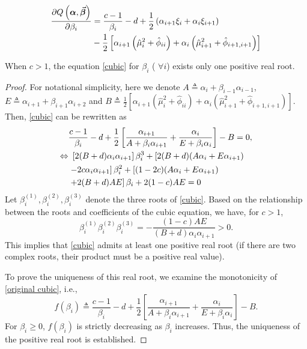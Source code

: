 \documentclass[10pt,a4paper]{amsart}
\begin{document}
\begin{align}
	\frac{\partial Q\left(\boldsymbol{\alpha}, \vec{\boldsymbol{\beta}}\right)}{\partial \beta_{i}}&=\frac{c-1}{\beta_i}-d +\frac{1}{2} \left(\alpha_{i+1}\xi_i + \alpha_{i}\xi_{i+1} \right)\notag\\
	&-\frac{1}{2}\left[\alpha_{i+1}\left(\hat{\mu}_i^2+\hat{\phi}_{ii}\right)+\alpha_i \left(\hat{\mu}_{i+1}^2+\hat{\phi}_{i+1,i+1}\right)\right]\label{cubic} 
\end{align}

\begin{theorem}\label{Thm1}
	When \( c > 1 \), the equation \eqref{cubic} for \( \beta_i \) ( \(\forall  i \)) exists only one positive real root.
\end{theorem}

\begin{proof}
	For notational simplicity, here we denote $A \triangleq \alpha_i+\beta_{i-1} \alpha_{i-1}$, $E \triangleq \alpha_{i+1}+\beta_{i+1}\alpha_{i+2}$ and $B \triangleq \frac{1}{2}\left[\alpha_{i+1}\left(\hat{\mu}_i^2+\hat{\phi}_{ii}\right)+\alpha_i \left(\hat{\mu}_{i+1}^2+\hat{\phi}_{i+1,i+1}\right)\right]$. Then, 
	\eqref{cubic} can be rewritten as
	\begin{align}
		&\frac{c-1}{\beta_i}-d+\frac{1}{2}\left[\frac{\alpha_{i+1}}{A+\beta_i\alpha_{i+1}}+\frac{\alpha_{i}}{E+\beta_i\alpha_{i}}\right]-B=0, \label{original cubic}\\
		\Leftrightarrow &~ \left[2(B+d)\alpha_i\alpha_{i+1}\right]\beta_{i}^3 +\left[2(B+d)(A\alpha_i+E\alpha_{i+1})\right. \notag\\
		&\left. -2c\alpha_i \alpha_{i+1}\right] \beta_{i}^2+\left[(1-2c)(A\alpha_i +E \alpha_{i+1})\right. \notag\\
		&\left. +2(B+d)AE\right]\beta_{i}+2(1-c)AE = 0 \label{simplify}
	\end{align}
	Let $\beta_i^{(1)}, \beta_i^{(2)}, \beta_i^{(3)}$ denote the three roots of \eqref{cubic}. Based on the relationship between the roots and coefficients of the cubic equation, we have, for $c>1$,
	\begin{equation}
		\beta_i^{(1)}\beta_i^{(2)}\beta_i^{(3)} = -\frac{(1-c)AE}{(B+d)\alpha_i\alpha_{i+1}}>0.
	\end{equation}
   This implies that \eqref{cubic} admits at least one positive real root (if there are two complex roots, their product must be a positive real value).
	
	To prove the uniqueness of this real root, we examine the monotonicity of  \eqref{original cubic}, i.e.,
	\begin{equation*}
		f(\beta_i) \triangleq \frac{c-1}{\beta_i}-d+\frac{1}{2}\left[\frac{\alpha_{i+1}}{A+\beta_i\alpha_{i+1}}+\frac{\alpha_{i}}{E+\beta_i\alpha_{i}}\right]-B.
	\end{equation*}
	  For \( \beta_i \geq 0 \), \( f(\beta_i) \) is strictly decreasing as \( \beta_i \) increases. Thus, the uniqueness of the positive real root is established.
\end{proof}
\end{document}
